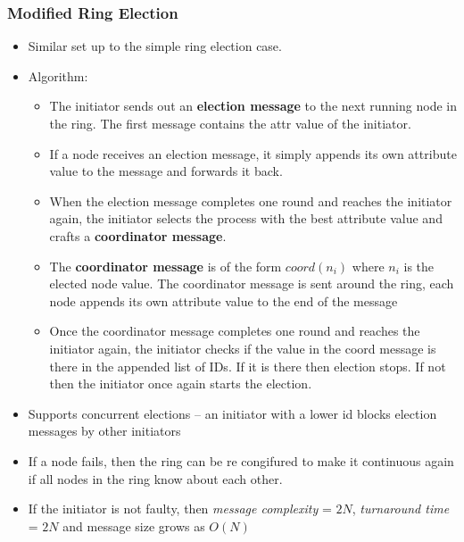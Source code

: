 \documentclass{article}
\begin{document}
\subsubsection{Modified Ring Election}
\begin{itemize}
    \item Similar set up to the simple ring election case. 
    
    \item Algorithm:
    \begin{itemize}
        \item The initiator sends out an \textbf{election message} to the next running node in the ring. The first message contains the attr value of the initiator. 
        
        \item If a node receives an election message, it simply appends its own attribute value to the message and forwards it back. 
        
        \item When the election message completes one round and reaches the initiator again, the initiator selects the process with the best attribute value and crafts a \textbf{coordinator message}. 
        
        \item The \textbf{coordinator message} is of the form $coord(n_i)$ where $n_i$ is the elected node value. The coordinator message is sent around the ring, each node appends its own attribute value to the end of the message
        
        \item Once the coordinator message completes one round and reaches the initiator again, the initiator checks if the value in the coord message is there in the appended list of IDs. If it is there then election stops. If not then the initiator once again starts the election. 
    \end{itemize}
    
    \item Supports concurrent elections – an initiator with a lower id blocks election messages by other initiators
    
    \item If a node fails, then the ring can be re congifured to make it continuous again if all nodes in the ring know about each other. 
    
    \item If the initiator is not faulty, then \textit{message complexity} = $2N$, \textit{turnaround time} = $2N$ and message size grows as $O(N)$
\end{itemize}
\end{document}
